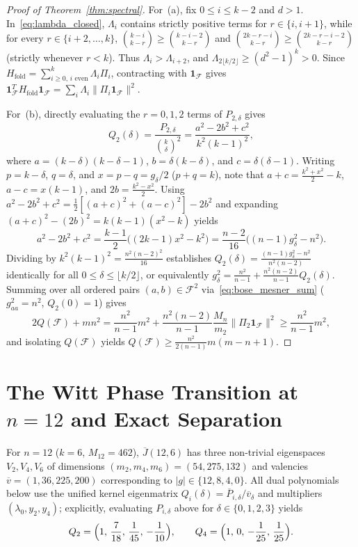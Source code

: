 \documentclass[11pt,reqno]{amsart}
\theoremstyle{definition}
\theoremstyle{remark}
\newcommand{\Jbar}{\overline{J}}
\newcommand{\F}{\mathcal{F}}
\begin{document}
\begin{proof}[Proof of Theorem~\ref{thm:spectral}]
For~(a), fix $0 \le i \le k-2$ and $d > 1$. In~\eqref{eq:lambda_closed}, $\Lambda_i$ contains strictly positive terms for $r \in \{i, i+1\}$, while for every $r \in \{i+2,\dots,k\}$, $\binom{k-i}{k-r} \ge \binom{k-i-2}{k-r}$ and $\binom{2k-r-i}{k-r} \ge \binom{2k-r-i-2}{k-r}$ (strictly whenever $r < k$). Thus $\Lambda_i > \Lambda_{i+2}$, and $\Lambda_{2\lfloor k/2 \rfloor} \ge (d^2-1)^k > 0$. Since $H_{\mathrm{fold}} = \sum_{i \ge 0,\, i\text{ even}}^k \Lambda_i \Pi_i$, contracting with $\mathbf{1}_{\F}$ gives $\mathbf{1}_{\F}^T H_{\mathrm{fold}} \mathbf{1}_{\F} = \sum_i \Lambda_i \|\Pi_i \mathbf{1}_{\F}\|^2$.

For~(b), directly evaluating the $r=0,1,2$ terms of $P_{2,\delta}$ gives
\[
Q_2(\delta) = \frac{P_{2,\delta}}{\binom{k}{\delta}^2} = \frac{a^2 - 2b^2 + c^2}{k^2(k-1)^2},
\]
where $a = (k-\delta)(k-\delta-1)$, $b = \delta(k-\delta)$, and $c = \delta(\delta-1)$. Writing $p = k-\delta$, $q = \delta$, and $x = p - q = g_\delta/2$ ($p + q = k$), note that $a + c = \frac{k^2 + x^2}{2} - k$, $a - c = x(k-1)$, and $2b = \frac{k^2 - x^2}{2}$. Using $a^2 - 2b^2 + c^2 = \frac{1}{2}[(a+c)^2 + (a-c)^2] - 2b^2$ and expanding $(a+c)^2 - (2b)^2 = k(k-1)(x^2 - k)$ yields
\[
a^2 - 2b^2 + c^2 = \frac{k-1}{2}\bigl((2k-1)x^2 - k^2\bigr) = \frac{n-2}{16}\bigl((n-1)g_\delta^2 - n^2\bigr).
\]
Dividing by $k^2(k-1)^2 = \frac{n^2(n-2)^2}{16}$ establishes $Q_2(\delta) = \frac{(n-1)g_\delta^2 - n^2}{n^2(n-2)}$ identically for all $0 \le \delta \le \lfloor k/2 \rfloor$, or equivalently $g_\delta^2 = \frac{n^2}{n-1} + \frac{n^2(n-2)}{n-1} Q_2(\delta)$. Summing over all ordered pairs $(a,b) \in \F^2$ via~\eqref{eq:bose_mesner_sum} ($g_{aa}^2 = n^2$, $Q_2(0) = 1$) gives
\[
2 Q(\F) + m n^2 = \frac{n^2}{n-1} m^2 + \frac{n^2(n-2)}{n-1}\frac{M_n}{m_2}\|\Pi_2\mathbf{1}_{\F}\|^2 \ge \frac{n^2}{n-1} m^2,
\]
and isolating $Q(\F)$ yields $Q(\F) \ge \frac{n^2}{2(n-1)} m(m - n + 1)$.
\end{proof}

\section{The Witt Phase Transition at $n=12$ and Exact Separation}\label{sec:witt}

For $n=12$ ($k=6$, $M_{12}=462$), $\Jbar(12,6)$ has three non-trivial eigenspaces $V_2, V_4, V_6$ of dimensions $(m_2, m_4, m_6) = (54, 275, 132)$ and valencies $\overline{v} = (1, 36, 225, 200)$ corresponding to $|g| \in \{12, 8, 4, 0\}$. All dual polynomials below use the unified kernel eigenmatrix $Q_i(\delta) = \overline{P}_{i,\delta}/\overline{v}_\delta$ and multipliers $(\lambda_0, y_2, y_4)$; explicitly, evaluating $P_{i,\delta}$ above for $\delta \in \{0,1,2,3\}$ yields
\[
Q_2 = \Bigl(1,\, \frac{7}{18},\, \frac{1}{45},\, -\frac{1}{10}\Bigr), \qquad Q_4 = \Bigl(1,\, 0,\, -\frac{1}{25},\, \frac{1}{25}\Bigr).
\]
\end{document}
